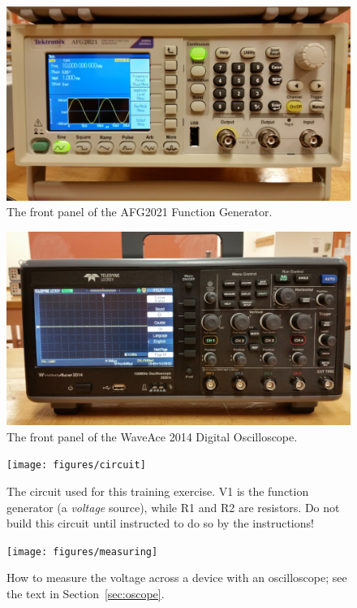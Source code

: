 \documentclass[12pt]{article}
\begin{document}
\begin{figure}
  \centering
  \includegraphics[width=\textwidth/2]{figures/tektronix_afg2021}
  \caption{The front panel of the AFG2021 Function Generator.}
  \label{fig:funcgen}
\end{figure}
\begin{figure}
  \centering
  \includegraphics[width=\textwidth/2]{figures/teledyne_lecroy_waveace2014}
  \caption{The front panel of the WaveAce 2014 Digital Oscilloscope.}
  \label{fig:oscope}
\end{figure}
\begin{figure}
  \centering
  \texttt{[image: figures/circuit]}
  \caption{The circuit used for this training exercise.  V1 is the
    function generator (a \textit{voltage} source), while R1 and R2
    are resistors. Do not build this circuit until instructed to do so
    by the instructions!}
  \label{fig:circuit}
\end{figure}
\begin{figure}
  \centering
  \texttt{[image: figures/measuring]}
  \caption{How to measure the voltage across a device with an
    oscilloscope; see the text in Section~\ref{sec:oscope}.}
  \label{fig:measuring}
\end{figure}
\end{document}
